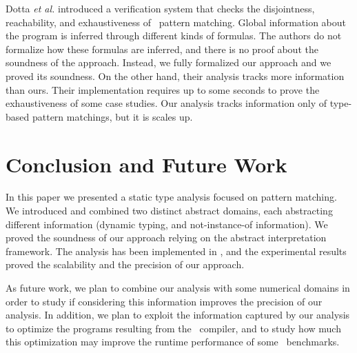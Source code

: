\documentclass{llncs}
\begin{document}
Dotta \textit{et al.} \cite{DSK08} introduced a verification system that checks the disjointness, reachability, and exhaustiveness of \Scala\ pattern matching. Global information about the program is inferred through different kinds of formulas. The authors do not formalize how these formulas are inferred, and there is no proof about the soundness of the approach. Instead, we fully formalized our approach and we proved its soundness. On the other hand, their analysis tracks more information than ours. Their implementation requires up to some seconds to prove the exhaustiveness of some case studies. Our analysis tracks information only of type-based pattern matchings, but it is scales up.


\section{Conclusion and Future Work}
\label{sect:conclusion}

In this paper we presented a static type analysis focused on pattern matching. We introduced and combined two distinct abstract domains, each abstracting different information (dynamic typing, and not-instance-of information). We proved the soundness of our approach relying on the abstract interpretation framework. The analysis has been implemented in \analyzer, and the experimental results proved the scalability and the precision of our approach.

As future work, we plan to combine our analysis with some numerical domains in order to study if considering this information improves the precision of our analysis. In addition, we plan to exploit the information captured by our analysis to optimize the programs resulting from the \Scala\ compiler, and to study how much this optimization may improve the runtime performance of some \Scala\ benchmarks.




\newpage

\appendix
\end{document}
